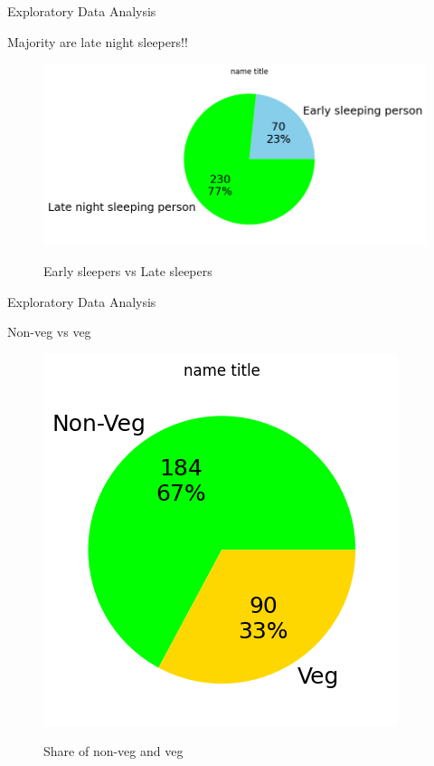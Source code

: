 \documentclass{beamer}
\begin{document}
\begin{frame}{Exploratory Data Analysis}
\begin{block}{Majority are late night sleepers!!}
\begin{figure}
      \centering
    \caption{Early sleepers vs Late sleepers}
    \includegraphics[scale = 0.55]{pie_sleep_categoty.png}  
    \label{fig:side-by-side}
\end{figure}
\end{block}
\end{frame}
\begin{frame}{Exploratory Data Analysis}
\begin{block}{Non-veg vs veg}
\begin{figure}
      \centering
    \caption{Share of non-veg and veg}
    \includegraphics[scale = 0.55]{pie_veg_non-veg.png}  
    \label{pie_veg_non_veg}
\end{figure}
\end{block}
\end{frame}
\end{document}
